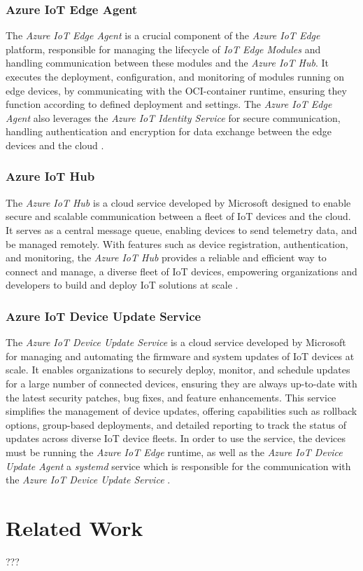 \subsubsection{Azure IoT Edge Agent}
The \textit{Azure IoT Edge Agent} is a crucial component of the \textit{Azure IoT Edge}
platform, responsible for managing the lifecycle of \textit{IoT Edge Modules} and
handling communication between these modules and the \textit{Azure IoT Hub}.
It executes the deployment, configuration, and monitoring of modules running on
edge devices, by communicating with the \ac{OCI}-container runtime,
ensuring they function according to defined deployment and settings.
The \textit{Azure IoT Edge Agent} also leverages the \textit{Azure IoT Identity Service}
for secure communication, handling authentication and encryption for data exchange
between the edge devices and the cloud \cite{msdoc-aziotedge-arch}.


\subsubsection{Azure IoT Hub}
The \textit{Azure IoT Hub} is a cloud service developed by Microsoft designed to
enable secure and scalable communication between a fleet of \ac{IoT} devices and
the cloud. It serves as a central message queue, enabling devices to send telemetry
data, and be managed remotely. With features such as device registration,
authentication, and monitoring, the \textit{Azure IoT Hub} provides a reliable and efficient
way to connect and manage, a diverse fleet of \ac{IoT} devices, empowering
organizations and developers to build and deploy \ac{IoT} solutions at scale \cite{msdoc-aziothub}.

\subsubsection{Azure IoT Device Update Service}
The \textit{Azure IoT Device Update Service} is a cloud service developed by Microsoft
for managing and automating the firmware and system updates of \ac{IoT} devices at scale.
It enables organizations to securely deploy, monitor, and schedule updates for
a large number of connected devices, ensuring they are always up-to-date with
the latest security patches, bug fixes, and feature enhancements. This service
simplifies the management of device updates, offering capabilities such as
rollback options, group-based deployments, and detailed reporting to track the
status of updates across diverse \ac{IoT} device fleets. In order to use the service,
the devices must be running the \textit{Azure IoT Edge} runtime, as well as the
\textit{Azure IoT Device Update Agent} a \textit{systemd} service which is
responsible for the communication with the \textit{Azure IoT Device Update Service}
\cite{msdoc-adu}.


\section{Related Work}
\begin{tcolorbox}[title=TODO]
???
\end{tcolorbox}
